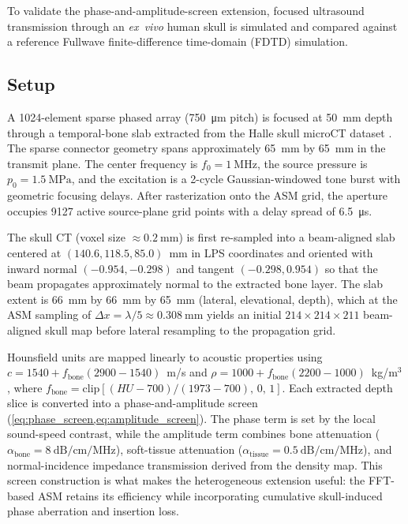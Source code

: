 \documentclass[11pt]{article}
\begin{document}
To validate the phase-and-amplitude-screen extension, focused
ultrasound transmission through an \emph{ex~vivo} human skull is
simulated and compared against a reference Fullwave
\cite{pinton2009,pinton2014} finite-difference time-domain (FDTD)
simulation.

\subsection{Setup}
\label{sec:transcranial:setup}

A 1024-element sparse phased array (\SI{750}{\micro\meter} pitch) is
focused at \SI{50}{\milli\meter} depth through a temporal-bone slab
extracted from the Halle skull microCT dataset \cite{halle_skull}.  The sparse
connector geometry spans approximately
\SI{65}{\milli\meter} by \SI{65}{\milli\meter} in the transmit
plane.  The center frequency is $f_0 = \SI{1}{\mega\hertz}$, the source
pressure is $p_0 = \SI{1.5}{\mega\pascal}$, and the excitation is a
2-cycle Gaussian-windowed tone burst with geometric focusing delays.
After rasterization onto the ASM grid, the aperture occupies 9127
active source-plane grid points with a delay spread of
\SI{6.5}{\micro\second}.

The skull CT (voxel size $\approx\!\SI{0.2}{\milli\meter}$) is first
re-sampled into a beam-aligned slab centered at
$(140.6,118.5,85.0)$~mm in LPS coordinates and oriented with inward
normal $(-0.954,-0.298)$ and tangent $(-0.298,0.954)$ so that the beam
propagates approximately normal to the extracted bone layer.  The slab
extent is
\SI{66}{\milli\meter} by \SI{66}{\milli\meter} by \SI{65}{\milli\meter}
(lateral, elevational, depth), which at the ASM sampling of
$\Delta x = \lambda/5 \approx \SI{0.308}{\milli\meter}$ yields an
initial $214 \times 214 \times 211$ beam-aligned skull map before
lateral resampling to the propagation grid.

Hounsfield units are mapped linearly to acoustic properties using
$c = 1540 + f_{\mathrm{bone}}(2900 - 1540)$~m/s and
$\rho = 1000 + f_{\mathrm{bone}}(2200 - 1000)$~kg/m$^3$, where
$f_{\mathrm{bone}} = \mathrm{clip}[(HU - 700)/(1973 - 700),\,0,\,1]$.
Each extracted depth slice is converted into a phase-and-amplitude
screen (\cref{eq:phase_screen,eq:amplitude_screen}).  The phase term is
set by the local sound-speed contrast, while the amplitude term combines
bone attenuation
($\alpha_{\mathrm{bone}} = \SI{8}{\dB\per\cm\per\MHz}$),
soft-tissue attenuation
($\alpha_{\mathrm{tissue}} = \SI{0.5}{\dB\per\cm\per\MHz}$), and
normal-incidence impedance transmission derived from the density map.
This screen construction is what makes the heterogeneous extension
useful: the FFT-based ASM retains its efficiency while incorporating
cumulative skull-induced phase aberration and insertion loss.
\end{document}
